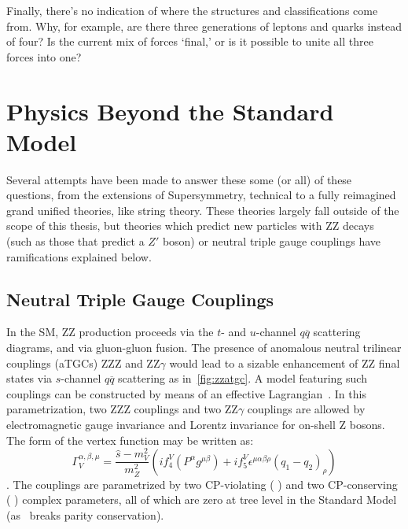 Finally, there's no indication of where the structures and classifications come
from. Why, for example, are there three generations of leptons and quarks
instead of four? Is the current mix of forces `final,' or is it possible to unite
all three forces into one? 

\section{Physics Beyond the Standard Model}
\label{sec:beyond}

Several attempts have been made to answer these some (or all) of these
questions, from the extensions of Supersymmetry, technical to a fully reimagined
grand unified theories, like string theory.  These  theories largely fall
outside of the scope of this thesis, but theories which predict new particles
with ZZ decays (such as those that predict a $Z'$ boson) or neutral triple gauge
couplings have ramifications explained below.

\subsection{Neutral Triple Gauge Couplings}
In the SM, ZZ production proceeds via the $t$- and $u$-channel
$q\overline q$ scattering diagrams, and via gluon-gluon fusion.  The presence of
anomalous neutral trilinear couplings (aTGCs) ZZZ and ZZ$\gamma$
would lead to a sizable enhancement of ZZ final states via $s$-channel
$q\overline q$ scattering as in~\ref{fig:zzatgc}.  A model featuring such
couplings can be constructed by means of an effective
Lagrangian~\cite{Hagiwara:1987tv}.  In this parametrization, two ZZZ couplings
and two ZZ$\gamma$ couplings are allowed by electromagnetic gauge invariance and
Lorentz invariance for on-shell Z bosons.  The form of the vertex function may
be written as: 
\begin{equation}
    \Gamma^{\alpha,\beta,\mu}_{V} = \frac{\hat s-m_V^2}{m_Z^2}\left(
        i f_4^V \left( P^\alpha g^{\mu\beta} \right ) + 
    i f_5^V\epsilon^{\mu\alpha\beta\rho}\left ( q_1-q_2\right)_\rho \right)
\end{equation}.
The couplings are parametrized by two CP-violating (
\ffour ) and two CP-conserving ( \ffive ) complex parameters, all of which are
zero at tree level in the Standard Model (as \ffive~breaks parity conservation).

